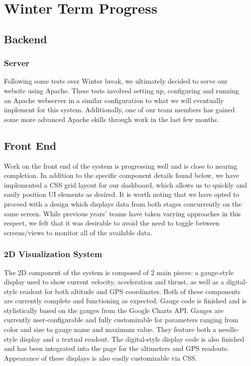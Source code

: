 \documentclass[journal,10pt,onecolumn,compsoc]{IEEEtran}
\begin{document}
\section{Winter Term Progress}

	\subsection{Backend}
		
		\subsubsection{}
			
		\subsubsection{}
		
		\subsubsection{Server}
			Following some tests over Winter break, we ultimately decided to serve our website using Apache.
			These tests involved setting up, configuring and running an Apache webserver in a similar configuration to what we will eventually implement for this system.
			Additionally, one of our team members has gained some more advanced Apache skills through work in the last few months.
	
	\subsection{Front End}
		Work on the front end of the system is progressing well and is close to nearing completion.
		In addition to the specific component details found below, we have implemented a CSS grid layout for our dashboard, which allows us to quickly and easily position UI elements as desired.
		It is worth noting that we have opted to proceed with a design which displays data from both stages concurrently on the same screen.
		While previous years' teams have taken varying approaches in this respect, we felt that it was desirable to avoid the need to toggle between screens/views to monitor all of the available data.
	
		\subsubsection{2D Visualization System}
			The 2D component of the system is composed of 2 main pieces: a gauge-style display used to show current velocity, acceleration and thrust, as well as a digital-style readout for both altitude and GPS coordinates.
			Both of these components are currently complete and functioning as expected.
			Gauge code is finished and is stylistically based on the gauges from the Google Charts API.
			Gauges are currently user-configurable and fully customizable for parameters ranging from color and size to gauge name and maximum value.
			They feature both a needle-style display and a textual readout.
			The digital-style display code is also finished and has been integrated into the page for the altimeters and GPS readouts. 
			Appearance of these displays is also easily customizable via CSS.
			
\end{document}
